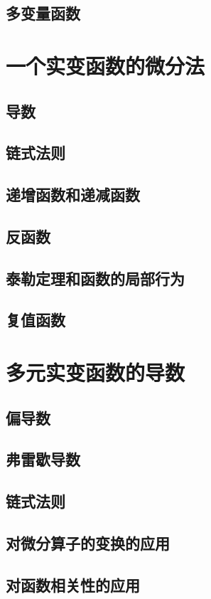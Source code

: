 \section{多变量函数}

\chapter{一个实变函数的微分法}
\section{导数}
\section{链式法则}
\section{递增函数和递减函数}
\section{反函数}
\section{泰勒定理和函数的局部行为}
\section{复值函数}

\chapter{多元实变函数的导数}
\section{偏导数}
\section{弗雷歇导数}
\section{链式法则}
\section{对微分算子的变换的应用}
\section{对函数相关性的应用}

